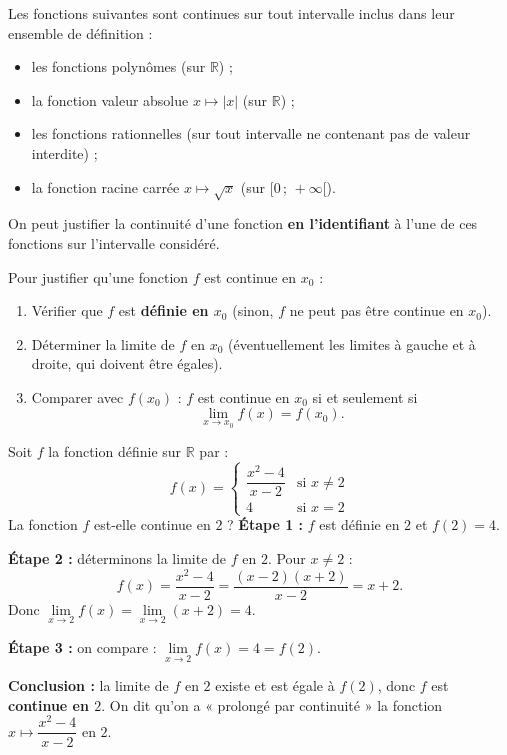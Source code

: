 \documentclass[11pt]{article}
\newcommand{\cle}[1]{{\popxbold\color{popdark}#1}}
\begin{document}
\begin{propriete}
Les fonctions suivantes sont continues sur tout intervalle inclus dans leur ensemble de définition :
\begin{itemize}
\item les fonctions polynômes (sur $\mathbb{R}$) ;
\item la fonction valeur absolue $x \mapsto |x|$ (sur $\mathbb{R}$) ;
\item les fonctions rationnelles (sur tout intervalle ne contenant pas de valeur interdite) ;
\item la fonction racine carrée $x \mapsto \sqrt{x}$ (sur $[0\,;\,+\infty[$).
\end{itemize}
On peut justifier la continuité d'une fonction \textbf{en l'identifiant} à l'une de ces fonctions sur l'intervalle considéré.
\end{propriete}

\begin{methode}
Pour justifier qu'une fonction $f$ est \cle{continue en} $x_0$ :
\begin{enumerate}
\item Vérifier que $f$ est \textbf{définie en $x_0$} (sinon, $f$ ne peut pas être continue en $x_0$).
\item Déterminer la limite de $f$ en $x_0$ (éventuellement les limites à gauche et à droite, qui doivent être égales).
\item Comparer avec $f(x_0)$ : $f$ est continue en $x_0$ si et seulement si
\[ \lim_{x\to x_0}f(x)=f(x_0). \]
\end{enumerate}
\end{methode}

\begin{exoresolu}
Soit $f$ la fonction définie sur $\mathbb{R}$ par :
\[ f(x)=\begin{cases} \dfrac{x^2-4}{x-2} & \text{si } x\neq 2 \\ 4 & \text{si } x=2 \end{cases} \]
La fonction $f$ est-elle continue en $2$ ?
\tcblower
\textbf{Étape 1 :} $f$ est définie en $2$ et $f(2)=4$.

\textbf{Étape 2 :} déterminons la limite de $f$ en $2$. Pour $x\neq 2$ :
\[ f(x)=\dfrac{x^2-4}{x-2}=\dfrac{(x-2)(x+2)}{x-2}=x+2. \]
Donc $\lim\limits_{x\to 2}f(x)=\lim\limits_{x\to 2}(x+2)=4$.

\textbf{Étape 3 :} on compare : $\lim\limits_{x\to 2}f(x)=4=f(2)$.

\textbf{Conclusion :} la limite de $f$ en $2$ existe et est égale à $f(2)$, donc $f$ est \textbf{continue en $2$}. On dit qu'on a « prolongé par continuité » la fonction $x\mapsto\dfrac{x^2-4}{x-2}$ en $2$.
\end{exoresolu}
\end{document}
